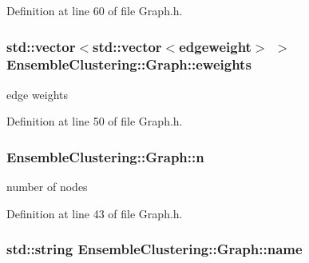 Definition at line 60 of file Graph.\-h.

\hypertarget{class_ensemble_clustering_1_1_graph_a30b12d6bf4e817512b304cb9feb54122}{
\subsubsection[{eweights}]{\setlength{\rightskip}{0pt plus 5cm}std\-::vector$<$std\-::vector$<${\bf edgeweight}$>$ $>$ Ensemble\-Clustering\-::\-Graph\-::eweights\hspace{0.3cm}{\ttfamily [protected]}}}\label{class_ensemble_clustering_1_1_graph_a30b12d6bf4e817512b304cb9feb54122}


edge weights 



Definition at line 50 of file Graph.\-h.

\hypertarget{class_ensemble_clustering_1_1_graph_a025fcfba990314b11b1f27d077b5319a}{
\subsubsection[{n}]{ Ensemble\-Clustering\-::\-Graph\-::n\hspace{0.3cm}{\ttfamily [protected]}}}\label{class_ensemble_clustering_1_1_graph_a025fcfba990314b11b1f27d077b5319a}


number of nodes 



Definition at line 43 of file Graph.\-h.

\hypertarget{class_ensemble_clustering_1_1_graph_a519d6a3c44c3a6d8f46ba448cb691710}{
\subsubsection[{name}]{\setlength{\rightskip}{0pt plus 5cm}std\-::string Ensemble\-Clustering\-::\-Graph\-::name\hspace{0.3cm}{\ttfamily [protected]}}}\label{class_ensemble_clustering_1_1_graph_a519d6a3c44c3a6d8f46ba448cb691710}


